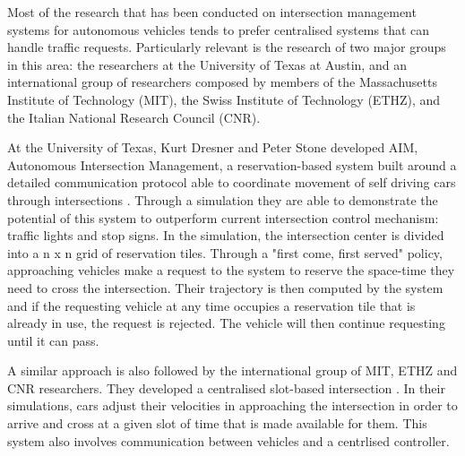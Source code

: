Most of the research that has been conducted on intersection management systems for autonomous vehicles tends to prefer centralised systems that can handle traffic requests.
Particularly relevant is the research of two major groups in this area: the researchers at the University of Texas at Austin, and an international group of researchers composed by members of the Massachusetts Institute of Technology (MIT), the Swiss Institute of Technology (ETHZ), and the Italian National Research Council (CNR).

At the University of Texas, Kurt Dresner and Peter Stone developed AIM, Autonomous Intersection Management, a reservation-based system built around a detailed communication protocol able to coordinate movement of self driving cars through intersections \cite{texas}.
Through a simulation they are able to demonstrate the potential of this system to outperform current intersection control mechanism: traffic lights and stop signs.
In the simulation, the intersection center is divided into a n x n grid of reservation tiles.
Through a "first come, first served" policy, approaching vehicles make a request to the system to reserve the space-time they need to cross the intersection. 
Their trajectory is then computed by the system and if the requesting vehicle at any time occupies a reservation tile that is already in use, the request is rejected.
The vehicle will then continue requesting until it can pass.

A similar approach is also followed by the international group of MIT, ETHZ and CNR researchers.
They developed a centralised slot-based intersection \cite{mit}.
In their simulations, cars adjust their velocities in approaching the intersection in order to arrive and cross at a given slot of time that is made available for them.
This system also involves communication between vehicles and a centrlised controller.